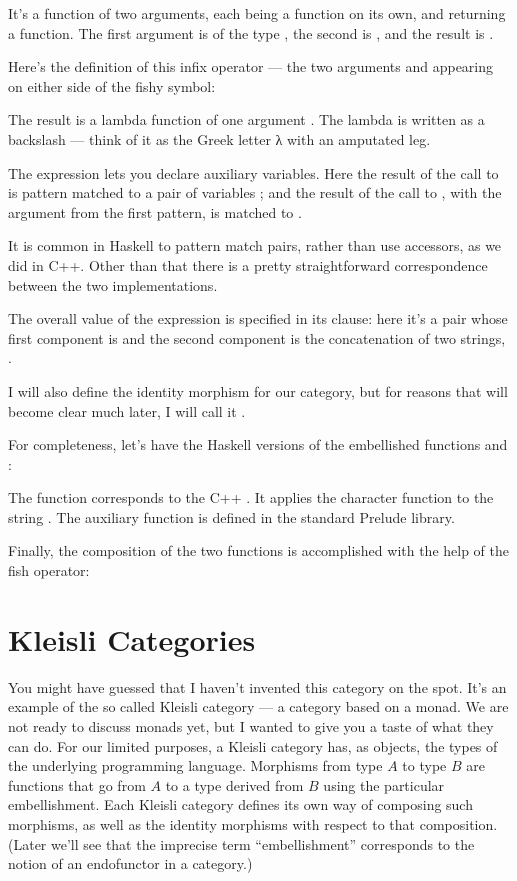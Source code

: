 It's a function of two arguments, each being a function on its own, and
returning a function. The first argument is of the type
, the second is
, and the result is
.

Here's the definition of this infix operator --- the two arguments
 and  appearing on either side of the fishy
symbol:

The result is a lambda function of one argument . The lambda
is written as a backslash --- think of it as the Greek letter λ with an
amputated leg.

The  expression lets you declare auxiliary variables. Here
the result of the call to  is pattern matched to a pair of
variables ; and the result of the call to ,
with the argument  from the first pattern, is matched to
.

It is common in Haskell to pattern match pairs, rather than use
accessors, as we did in C++. Other than that there is a pretty
straightforward correspondence between the two implementations.

The overall value of the  expression is specified in its
 clause: here it's a pair whose first component is 
and the second component is the concatenation of two strings,
.

I will also define the identity morphism for our category, but for
reasons that will become clear much later, I will call it
.

For completeness, let's have the Haskell versions of the embellished
functions  and :

The function  corresponds to the C++ . It
applies the character function  to the string
. The auxiliary function  is defined in the
standard Prelude library.

Finally, the composition of the two functions is accomplished with the
help of the fish operator:


\section{Kleisli Categories}

You might have guessed that I haven't invented this category on the
spot. It's an example of the so called Kleisli category --- a category
based on a monad. We are not ready to discuss monads yet, but I wanted
to give you a taste of what they can do. For our limited purposes, a
Kleisli category has, as objects, the types of the underlying
programming language. Morphisms from type $A$ to type $B$ are functions that
go from $A$ to a type derived from $B$ using the particular embellishment.
Each Kleisli category defines its own way of composing such morphisms,
as well as the identity morphisms with respect to that composition.
(Later we'll see that the imprecise term ``embellishment'' corresponds
to the notion of an endofunctor in a category.)

